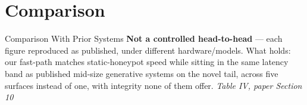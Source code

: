 \documentclass[aspectratio=169, 11pt]{beamer}
\newcommand{\srcnote}[1]{{\footnotesize\color{gray}\textit{#1}}}
\begin{document}
\section{Comparison}
\begin{frame}{Comparison With Prior Systems}
    \scriptsize
    \renewcommand{\arraystretch}{1.3}
    \vspace{3mm}
    \normalsize
    \textbf{Not a controlled head-to-head} --- each figure reproduced as published, under different hardware/models. What holds: our fast-path matches static-honeypot speed while sitting in the same latency band as published mid-size generative systems on the novel tail, across five surfaces instead of one, with integrity none of them offer.
    \srcnote{Table IV, paper Section 10}
\end{frame}

\end{document}
